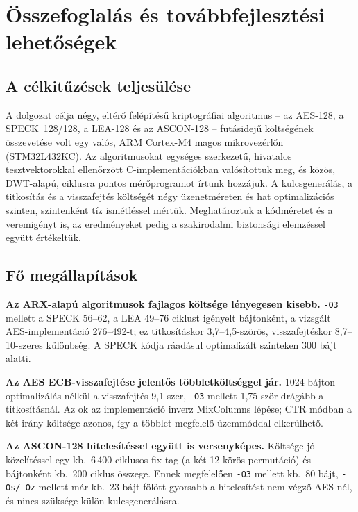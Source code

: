 \documentclass[a4paper,12pt]{report}
\theoremstyle{definition}
\theoremstyle{remark}
\begin{document}
\chapter{Összefoglalás és továbbfejlesztési lehetőségek}\label{chap:osszefoglalas}

\section{A célkitűzések teljesülése}

A dolgozat célja négy, eltérő felépítésű kriptográfiai algoritmus -- az AES-128, a SPECK~128/128, a LEA-128 és az ASCON-128 -- futásidejű költségének összevetése volt egy valós, ARM Cortex-M4 magos mikrovezérlőn (STM32L432KC). Az algoritmusokat egységes szerkezetű, hivatalos tesztvektorokkal ellenőrzött C-implementációkban valósítottuk meg, és közös, DWT-alapú, ciklusra pontos mérőprogramot írtunk hozzájuk. A kulcsgenerálás, a titkosítás és a visszafejtés költségét négy üzenetméreten és hat optimalizációs szinten, szintenként tíz ismétléssel mértük. Meghatároztuk a kódméretet és a veremigényt is, az eredményeket pedig a szakirodalmi biztonsági elemzéssel együtt értékeltük.

\section{Fő megállapítások}

\textbf{Az ARX-alapú algoritmusok fajlagos költsége lényegesen kisebb.} \texttt{-O3} mellett a SPECK 56--62, a LEA 49--76 ciklust igényelt bájtonként, a vizsgált AES-implementáció 276--492-t; ez titkosításkor 3,7--4,5-szörös, visszafejtéskor 8,7--10-szeres különbség. A SPECK kódja ráadásul optimalizált szinteken 300 bájt alatti.

\textbf{Az AES ECB-visszafejtése jelentős többletköltséggel jár.} 1024 bájton optimalizálás nélkül a visszafejtés 9,1-szer, \texttt{-O3} mellett 1,75-ször drágább a titkosításnál. Az ok az implementáció inverz MixColumns lépése; CTR módban a két irány költsége azonos, így a többlet megfelelő üzemmóddal elkerülhető.

\textbf{Az ASCON-128 hitelesítéssel együtt is versenyképes.} Költsége jó közelítéssel egy kb.\ 6\,400 ciklusos fix tag (a két 12 körös permutáció) és bájtonként kb.\ 200 ciklus összege. Ennek megfelelően \texttt{-O3} mellett kb.\ 80 bájt, \texttt{-Os/-Oz} mellett már kb.\ 23 bájt fölött gyorsabb a hitelesítést nem végző AES-nél, és nincs szüksége külön kulcsgenerálásra.
\end{document}
